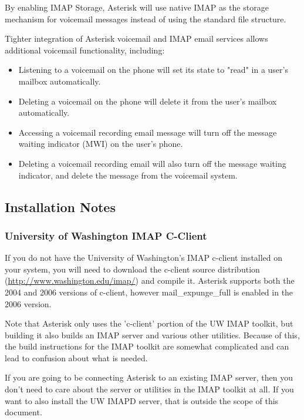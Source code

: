 By enabling IMAP Storage,  Asterisk will use native IMAP as the storage
mechanism for voicemail messages instead of using the standard file structure.

Tighter integration of Asterisk voicemail and IMAP email services allows
additional voicemail functionality, including:

\begin{itemize}
 \item Listening to a voicemail on the phone will set its state to "read" in
   a user's mailbox automatically.
 \item Deleting a voicemail on the phone will delete it from the user's
   mailbox automatically.
 \item Accessing a voicemail recording email message will turn off the message
   waiting indicator (MWI) on the user's phone.
 \item Deleting a voicemail recording email will also turn off the message
   waiting indicator, and delete the message from the voicemail system.
\end{itemize}

\subsection{Installation Notes}

\subsubsection{University of Washington IMAP C-Client}

If you do not have the University of Washington's IMAP c-client
installed on your system, you will need to download the c-client
source distribution (\url{http://www.washington.edu/imap/}) and compile it.
Asterisk supports both the 2004 and 2006 versions of c-client, however
mail\_expunge\_full is enabled in the 2006 version.

Note that Asterisk only uses the 'c-client' portion of the UW IMAP toolkit,
but building it also builds an IMAP server and various other utilities.
Because of this, the build instructions for the IMAP toolkit are somewhat
complicated and can lead to confusion about what is needed.

If you are going to be connecting Asterisk to an existing IMAP server,
then you don't need to care about the server or utilities in the IMAP
toolkit at all. If you want to also install the UW IMAPD server, that
is outside the scope of this document.

